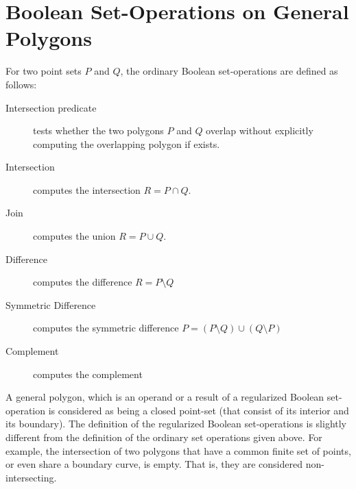 \section{Boolean Set-Operations on General Polygons}
\label{bobs_sec:bops}
For two point sets $P$ and $Q$, the ordinary Boolean set-operations are
defined as follows:
\begin{description}
\item [Intersection predicate] tests whether the two polygons $P$ and $Q$
  overlap without explicitly computing the overlapping polygon if exists.
\item[Intersection] computes the intersection $R = P \cap Q$.
\item[Join] computes the union $R = P \cup Q$.
\item [Difference] computes the difference $R = P \setminus Q$ 
\item [Symmetric Difference] computes the symmetric difference
  $P = (P \setminus Q) \cup (Q \setminus P)$
\item[Complement] computes the complement
\end{description}

A general polygon, which is an operand or a result of a regularized
Boolean set-operation is considered as being a closed point-set (that
consist of its interior and its boundary). The definition of the regularized 
Boolean set-operations is slightly different from the definition of the 
ordinary set operations given above. For example, the intersection of
two polygons that have a common finite set of points, or even 
share a boundary curve, is empty. That is, they are considered 
non-intersecting.

